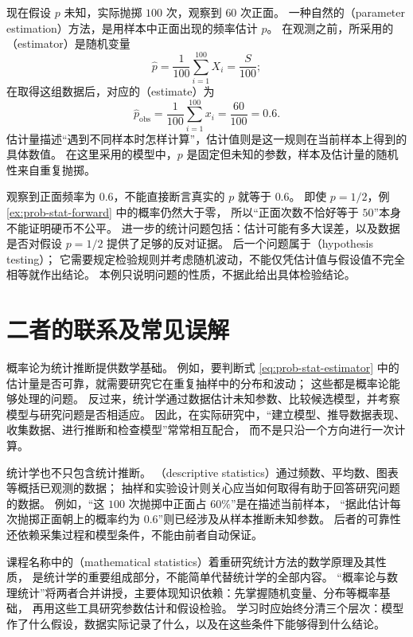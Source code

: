 \documentclass[UTF8]{ctexart}
\begin{document}
\begin{example}
\label{ex:prob-stat-inference}
现在假设 $p$ 未知，实际抛掷 $100$ 次，观察到 $60$ 次正面。
一种自然的（parameter estimation）方法，是用样本中正面出现的频率估计 $p$。
在观测之前，所采用的（estimator）是随机变量
\begin{equation}
  \widehat p=\frac{1}{100}\sum_{i=1}^{100}X_i=\frac{S}{100};
  \label{eq:prob-stat-estimator}
\end{equation}
在取得这组数据后，对应的（estimate）为
\[
  \widehat p_{\mathrm{obs}}=\frac{1}{100}\sum_{i=1}^{100}x_i=\frac{60}{100}=0.6.
\]
估计量描述“遇到不同样本时怎样计算”，估计值则是这一规则在当前样本上得到的具体数值。
在这里采用的模型中，$p$ 是固定但未知的参数，样本及估计量的随机性来自重复抛掷。
\end{example}

观察到正面频率为 $0.6$，不能直接断言真实的 $p$ 就等于 $0.6$。
即使 $p=1/2$，例 \ref{ex:prob-stat-forward} 中的概率仍然大于零，
所以“正面次数不恰好等于 $50$”本身不能证明硬币不公平。
进一步的统计问题包括：估计可能有多大误差，以及数据是否对假设 $p=1/2$ 提供了足够的反对证据。
后一个问题属于（hypothesis testing）；
它需要规定检验规则并考虑随机波动，不能仅凭估计值与假设值不完全相等就作出结论。
本例只说明问题的性质，不据此给出具体检验结论。

\section{二者的联系及常见误解}
\label{sec:prob-stat-connection}

概率论为统计推断提供数学基础。
例如，要判断式 \eqref{eq:prob-stat-estimator} 中的估计量是否可靠，就需要研究它在重复抽样中的分布和波动；
这些都是概率论能够处理的问题。
反过来，统计学通过数据估计未知参数、比较候选模型，并考察模型与研究问题是否相适应。
因此，在实际研究中，“建立模型、推导数据表现、收集数据、进行推断和检查模型”常常相互配合，
而不是只沿一个方向进行一次计算。

统计学也不只包含统计推断。
（descriptive statistics）通过频数、平均数、图表等概括已观测的数据；
抽样和实验设计则关心应当如何取得有助于回答研究问题的数据。
例如，“这 $100$ 次抛掷中正面占 $60\%$”是在描述当前样本，
“据此估计每次抛掷正面朝上的概率约为 $0.6$”则已经涉及从样本推断未知参数。
后者的可靠性还依赖采集过程和模型条件，不能由前者自动保证。

课程名称中的（mathematical statistics）着重研究统计方法的数学原理及其性质，
是统计学的重要组成部分，不能简单代替统计学的全部内容。
“概率论与数理统计”将两者合并讲授，主要体现知识依赖：先掌握随机变量、分布等概率基础，
再用这些工具研究参数估计和假设检验。
学习时应始终分清三个层次：模型作了什么假设，数据实际记录了什么，以及在这些条件下能够得到什么结论。
\end{document}
